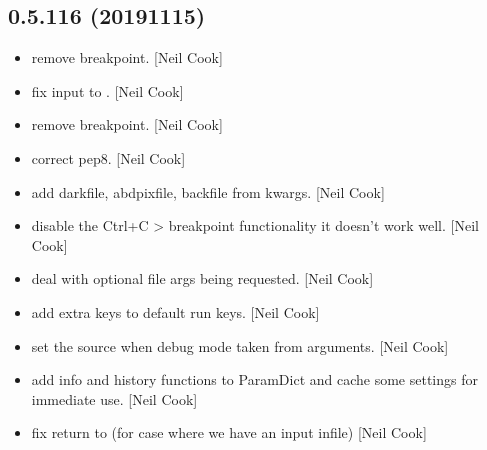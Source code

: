 \documentclass[a4paper,10pt,english]{report}
\begin{document}
\subsection{0.5.116 (2019\sphinxhyphen{}11\sphinxhyphen{}15)}
\label{\detokenize{misc/changelog:id46}}\begin{itemize}
\item {} 
 \sphinxhyphen{} remove breakpoint. {[}Neil Cook{]}

\item {} 
 \sphinxhyphen{} fix input to . {[}Neil Cook{]}

\item {} 
 \sphinxhyphen{} remove breakpoint. {[}Neil Cook{]}

\item {} 
 \sphinxhyphen{} correct pep8. {[}Neil Cook{]}

\item {} 
 \sphinxhyphen{} add darkfile, abdpixfile, backfile from
kwargs. {[}Neil Cook{]}

\item {} 
 \sphinxhyphen{} disable the Ctrl+C \textendash{}\textgreater{} breakpoint
functionality it doesn’t work well. {[}Neil Cook{]}

\item {} 
 \sphinxhyphen{} deal with optional file args
being requested. {[}Neil Cook{]}

\item {} 
 \sphinxhyphen{} add extra keys to default run
keys. {[}Neil Cook{]}

\item {} 
 \sphinxhyphen{} set the source when debug mode taken from
arguments. {[}Neil Cook{]}

\item {} 
 \sphinxhyphen{} add info and history functions to
ParamDict and cache some settings for immediate use. {[}Neil Cook{]}

\item {} 
 \sphinxhyphen{} fix return to 
(for case where we have an input infile) {[}Neil Cook{]}


\end{itemize}
\end{document}
